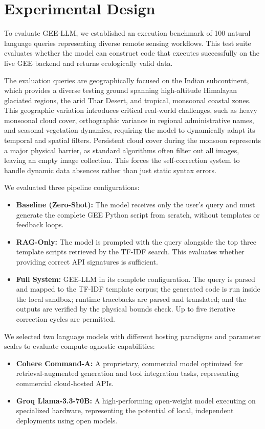 \documentclass[pdflatex,sn-mathphys-ay]{sn-jnl}
\begin{document}
\section{Experimental Design}\label{sec:experiments}

To evaluate GEE-LLM, we established an execution benchmark of 100 natural language queries representing diverse remote sensing workflows. This test suite evaluates whether the model can construct code that executes successfully on the live GEE backend and returns ecologically valid data.

The evaluation queries are geographically focused on the Indian subcontinent, which provides a diverse testing ground spanning high-altitude Himalayan glaciated regions, the arid Thar Desert, and tropical, monsoonal coastal zones. This geographic variation introduces critical real-world challenges, such as heavy monsoonal cloud cover, orthographic variance in regional administrative names, and seasonal vegetation dynamics, requiring the model to dynamically adapt its temporal and spatial filters. Persistent cloud cover during the monsoon represents a major physical barrier, as standard algorithms often filter out all images, leaving an empty image collection. This forces the self-correction system to handle dynamic data absences rather than just static syntax errors.

We evaluated three pipeline configurations:
\begin{itemize}
    \item \textbf{Baseline (Zero-Shot):} The model receives only the user's query and must generate the complete GEE Python script from scratch, without templates or feedback loops.
    \item \textbf{RAG-Only:} The model is prompted with the query alongside the top three template scripts retrieved by the TF-IDF search. This evaluates whether providing correct API signatures is sufficient.
    \item \textbf{Full System:} GEE-LLM in its complete configuration. The query is parsed and mapped to the TF-IDF template corpus; the generated code is run inside the local sandbox; runtime tracebacks are parsed and translated; and the outputs are verified by the physical bounds check. Up to five iterative correction cycles are permitted.
\end{itemize}

We selected two language models with different hosting paradigms and parameter scales to evaluate compute-agnostic capabilities:
\begin{itemize}
    \item \textbf{Cohere Command-A:} A proprietary, commercial model optimized for retrieval-augmented generation and tool integration tasks, representing commercial cloud-hosted APIs.
    \item \textbf{Groq Llama-3.3-70B:} A high-performing open-weight model executing on specialized hardware, representing the potential of local, independent deployments using open models.
\end{itemize}
\end{document}
